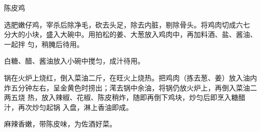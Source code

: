 %
%
%
%
%
%
%
\begin{recipe}{陈皮鸡}

\ingredients


\preparation

\step 选肥嫩仔鸡，宰杀后除净毛，砍去头足，除去内脏，剔除骨头。将鸡肉切成六七
分大的小块，盛入大碗中。用拍松的姜、大葱放入鸡肉中，再加料酒、盐、酱油、一起拌
匀，稍腌后待用。

\step 白糖、醋、酱油放入小碗中搅匀，成汁待用。

\step 锅在火炉上烧红，倒入菜油二斤，在旺火上烧热。把鸡肉（拣去葱、姜）放入油内
炸五分钟左右，呈金黄色时捞出；滗去锅中余油，将锅仍放火炉上，再倒入菜油二两五烧
热，放入辣椒、花椒、陈皮稍炸，随即再倒下鸡块，炒匀后即烹入糖醋汁，再次炒匀起锅
入盘，淋上香油即成。

\features

麻辣香嫩，带陈皮味，为佐酒好菜。

\end{recipe}


